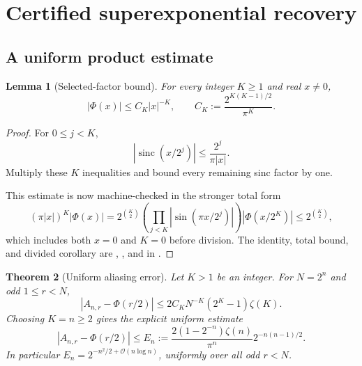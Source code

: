 \documentclass[11pt,oneside]{article}
\newtheorem{theorem}{Theorem}[section]
\newtheorem{lemma}[theorem]{Lemma}
\theoremstyle{definition}
\theoremstyle{remark}
\newcommand{\sinc}{\operatorname{sinc}}
\newcommand{\bigO}{\mathcal O}
\newcommand{\PhiU}{\Phi}
\begin{document}
\section{Certified superexponential recovery}\label{sec:alias-error}

\subsection{A uniform product estimate}

\begin{lemma}[Selected-factor bound]\label{lem:selected-factor-bound}
For every integer $K\ge1$ and real $x\ne0$,
\begin{equation}\label{eq:selected-factor-bound}
 |\PhiU(x)|\le C_K|x|^{-K},
 \qquad
 C_K:=\frac{2^{K(K-1)/2}}{\pi^K}.
\end{equation}
\end{lemma}

\begin{proof}
For $0\le j<K$,
\[
 \left|\sinc(x/2^j)\right|
 \le\frac{2^j}{\pi|x|}.
\]
Multiply these $K$ inequalities and bound every remaining sinc factor by one.

\smallskip\noindent
This estimate is now machine-checked in the stronger total form
\[
 (\pi|x|)^K|\PhiU(x)|
 =2^{\binom K2}
  \left(\prod_{j<K}\left|\sin(\pi x/2^j)\right|\right)
  |\PhiU(x/2^K)|
 \le 2^{\binom K2},
\]
which includes both $x=0$ and $K=0$ before division.  The identity, total
bound, and divided corollary are
,
, and
 in
.
\end{proof}

\begin{theorem}[Uniform aliasing error]\label{thm:alias-error}
Let $K>1$ be an integer.  For $N=2^n$ and odd $1\le r<N$,
\begin{equation}\label{eq:alias-error-general}
 \boxed{
 |A_{n,r}-\PhiU(r/2)|
 \le 2C_KN^{-K}(2^K-1)\zeta(K).}
\end{equation}
Choosing $K=n\ge2$ gives the explicit uniform estimate
\begin{equation}\label{eq:alias-error-n}
 \boxed{
 |A_{n,r}-\PhiU(r/2)|
 \le E_n:=
 \frac{2(1-2^{-n})\zeta(n)}{\pi^n}
 2^{-n(n-1)/2}.}
\end{equation}
In particular $E_n=2^{-n^2/2+\bigO(n\log n)}$, uniformly over all odd
$r<N$.
\end{theorem}
\end{document}
